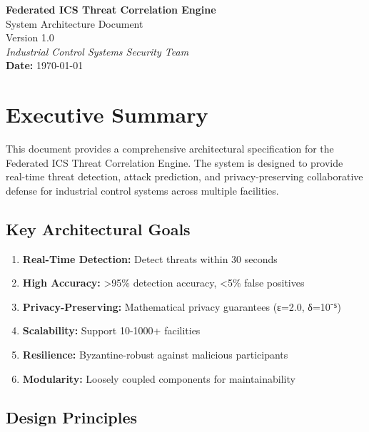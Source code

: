 \documentclass[12pt,a4paper]{article}
\begin{document}
\begin{center}
    \vspace*{0.5cm}
    {\Huge \textbf{Federated ICS Threat Correlation Engine}}\\[0.4cm]
    {\LARGE System Architecture Document}\\[0.3cm]
    {\large Version 1.0}\\[0.2cm]
    \textit{Industrial Control Systems Security Team}\\[0.1cm]
    \textbf{Date:} \today\\
    \vspace{0.5cm}
\end{center}

\tableofcontents
\newpage

\section{Executive Summary}

This document provides a comprehensive architectural specification for the Federated ICS Threat Correlation Engine.
The system is designed to provide real-time threat detection, attack prediction, and privacy-preserving collaborative defense for industrial control systems across multiple facilities.


\subsection{Key Architectural Goals}

\begin{enumerate}[leftmargin=1cm,itemsep=0pt]
    \item \textbf{Real-Time Detection:} Detect threats within 30 seconds
    \item \textbf{High Accuracy:} >95\% detection accuracy, <5\% false positives
    \item \textbf{Privacy-Preserving:} Mathematical privacy guarantees (ε=2.0, δ=10⁻⁵)
    \item \textbf{Scalability:} Support 10-1000+ facilities
    \item \textbf{Resilience:} Byzantine-robust against malicious participants
    \item \textbf{Modularity:} Loosely coupled components for maintainability
\end{enumerate}

\subsection{Design Principles}
\end{document}
